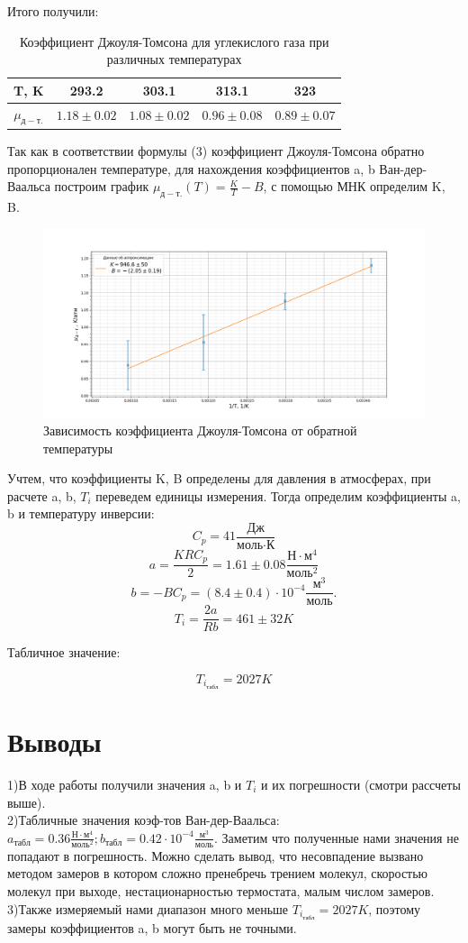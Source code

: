 \documentclass[a4paper, 12pt]{article}%
\begin{document}
	Итого получили:
	\begin{table}[H]
		\centering
		\begin{tabular}{|c|c|c|c|c|}
			\hline
			T, K  & 293.2     & 303.1     & 313.1     & 323       \\ \hline
			$\mu_{д-т.}$ & $1.18\pm 0.02$ & $1.08\pm 0.02$ & $0.96\pm 0.08$ & $0.89\pm 0.07$ \\ \hline
		\end{tabular}
		\caption{Коэффициент Джоуля-Томсона для углекислого газа при различных температурах}
	\end{table}
	Так как в соответствии формулы (3) коэффициент Джоуля-Томсона обратно пропорционален температуре, для нахождения коэффициентов a, b Ван-дер-Ваальса построим график $\mu_{д-т.}(T) = \frac{K}{T} - B$, с помощью МНК определим K, B.\begin{figure}[H]
		\centering
		\includegraphics[width=0.9\linewidth]{k_1t}
		\caption{Зависимость коэффициента Джоуля-Томсона от обратной температуры}
		\label{fig:k1t}
	\end{figure}
	Учтем, что коэффициенты K, B определены для давления в атмосферах, при расчете a, b, $T_i$ переведем единицы измерения. Тогда определим коэффициенты a, b и температуру инверсии:\\
	\[
	C_p = 41 \frac{\text{Дж}}{\text{моль} \cdot \text{К}}
	\]
	\[
	a = \frac{KRC_p}{2} = 1.61 \pm 0.08 \frac{\text{Н}\cdot\text{м}^4}{\text{моль}^2} 
	\]
	\[
	b = -BC_p  = (8.4 \pm 0.4)\cdot 10^{-4} \frac{\text{м}^3}{\text{моль}}.
	\]
	\[
	T_i = \frac{2a}{Rb} = 461 \pm 32 K
	\]
	\begin{center}
		Табличное значение:
	\end{center}
	\[
	T_{i_\text{табл}} = 2027 K
	\]
	\section{Выводы}
	1)В ходе работы получили значения a, b и $T_i$ и их погрешности (смотри рассчеты выше).\\
	2)Табличные значения коэф-тов Ван-дер-Ваальса: $a_{табл} = 0.36\frac{\text{Н}\cdot\text{м}^4}{\text{моль}^2};b_{табл}= 0.42\cdot 10^{-4} \frac{\text{м}^3}{\text{моль}}$. Заметим что полученные нами значения не попадают в погрешность. Можно сделать вывод, что несовпадение вызвано методом замеров в котором сложно пренебречь трением молекул, скоростью молекул при выходе, нестационарностью термостата, малым числом замеров.\\ 
	3)Также измеряемый нами диапазон много меньше $T_{i_\text{табл}} = 2027 K$, поэтому замеры коэффициентов a, b могут быть не точными.
\end{document}
